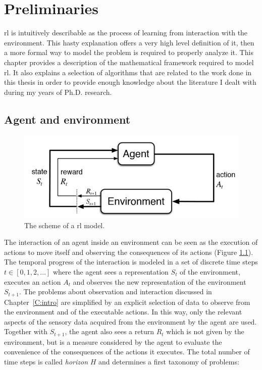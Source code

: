 \chapter{Preliminaries}
\gls{rl} is intuitively describable as the process of learning from interaction with the environment. This hasty explanation offers a very high level definition of it, then a more formal way to model the problem is required to properly analyze it. This chapter provides a description of the mathematical framework required to model \gls{rl}. It also explains a selection of algorithms that are related to the work done in this thesis in order to provide enough knowledge about the literature I dealt with during my years of Ph.D. research.

\section{Agent and environment}
\begin{figure}[b]
\begin{minipage}{\textwidth}
\begin{center}
  \includegraphics[scale=.75]{img/mdp1.jpg}
\end{center}
\end{minipage}
\caption[Reinforcement Learning problem scheme]{The scheme of a \gls{rl} model.}\label{F:mdp1}
\end{figure}
The interaction of an agent inside an environment can be seen as the execution of actions to move itself and observing the consequences of its actions (Figure \ref{F:mdp1}). The temporal progress of the interaction is modeled in a set of discrete time steps $t \in [0, 1, 2, \dots]$ where the agent sees a representation $S_t$ of the environment, executes an action $A_t$ and observes the new representation of the environment $S_{t+1}$. The problems about observation and interaction discussed in Chapter~\ref{C:intro} are simplified by an explicit selection of data to observe from the environment and of the executable actions. In this way, only the relevant aspects of the sensory data acquired from the environment by the agent are used. Together with $S_{t+1}$, the agent also sees a return $R_t$ which is not given by the environment, but is a measure considered by the agent to evaluate the convenience of the consequences of the actions it executes. The total number of time steps is called \textit{horizon} $H$ and determines a first taxonomy of problems:
